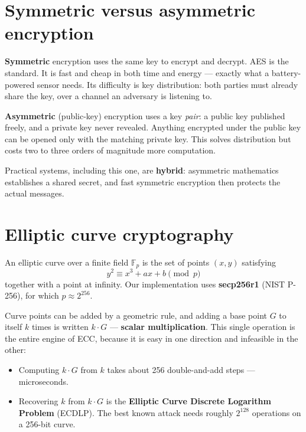 \section{Symmetric versus asymmetric encryption}

\textbf{Symmetric} encryption uses the same key to encrypt and decrypt. AES is the standard.
It is fast and cheap in both time and energy --- exactly what a battery-powered sensor
needs. Its difficulty is key distribution: both parties must already share the key, over a
channel an adversary is listening to.

\textbf{Asymmetric} (public-key) encryption uses a key \emph{pair}: a public key published
freely, and a private key never revealed. Anything encrypted under the public key can be
opened only with the matching private key. This solves distribution but costs two to three
orders of magnitude more computation.

Practical systems, including this one, are \textbf{hybrid}: asymmetric mathematics
establishes a shared secret, and fast symmetric encryption then protects the actual
messages.

\section{Elliptic curve cryptography}

An elliptic curve over a finite field $\mathbb{F}_p$ is the set of points $(x,y)$ satisfying
\begin{equation}
y^{2} \equiv x^{3} + ax + b \pmod{p}
\end{equation}
together with a point at infinity. Our implementation uses \textbf{secp256r1}
(NIST P-256), for which $p \approx 2^{256}$.

Curve points can be added by a geometric rule, and adding a base point $G$ to itself $k$
times is written $k \cdot G$ --- \textbf{scalar multiplication}. This single operation is the
entire engine of ECC, because it is easy in one direction and infeasible in the other:

\begin{itemize}
\item Computing $k \cdot G$ from $k$ takes about 256 double-and-add steps --- microseconds.
\item Recovering $k$ from $k \cdot G$ is the \textbf{Elliptic Curve Discrete Logarithm
      Problem} (ECDLP). The best known attack needs roughly $2^{128}$ operations on a
      256-bit curve.
\end{itemize}

